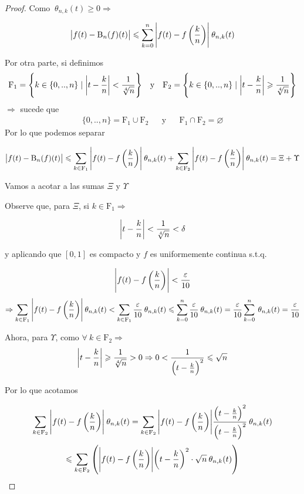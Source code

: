 \begin{proof}
    Como $\: {\theta}_{n,k} (t) \geqslant 0 \Rightarrow$

    $$\abs{f(t)-\mathrm{B}_n(f)(t)} \leqslant \sum\limits_{k=0}^{n} \abs{f(t)-f \left( \frac{k}{n} \right) } \: {\theta}_{n,k} (t)$$

    Por otra parte, si definimos 
    \begin{align*}
        \mathrm{F}_1= \left\{ k \in \{0, .., n \} \mid \abs{t-\frac{k}{n}} < \frac{1}{\sqrt[4]{n}} \right\} && \text{y} && \mathrm{F}_2= \left\{ k \in \{0, .., n \} \mid \abs{t-\frac{k}{n}} \geqslant \frac{1}{\sqrt[4]{n}} \right\}
    \end{align*}
    $\Rightarrow$ sucede que
    \begin{align*}
       \{0, .., n \} = \mathrm{F}_1 \cup \mathrm{F}_2 && \text{y} && \mathrm{F}_1 \cap \mathrm{F}_2 = \varnothing
    \end{align*}
    Por lo que podemos separar

    $$\abs{f(t)-\mathrm{B}_n(f)(t)} \leqslant \sum\limits_{k\in \mathrm{F}_1} \abs{f(t)-f \left( \frac{k}{n} \right) } \: {\theta}_{n,k} (t)  + \sum\limits_{k\in \mathrm{F}_2} \abs{f(t)-f \left( \frac{k}{n} \right) } \: {\theta}_{n,k} (t) = \Xi + \Upsilon$$

    Vamos a acotar a las sumas $\Xi$ y $\Upsilon$

    Observe que, para $\Xi$, si $k \in \mathrm{F}_1 \Rightarrow $ 
    
    $$\abs{t-\frac{k}{n}} < \frac{1}{\sqrt[4]{n}} < \delta$$ 
    
    y aplicando que $[0,1]$ es compacto y $f$ es uniformemente continua s.t.q. 
    
    $$\abs{f(t)-f\left( \frac{k}{n} \right)} < \frac{\varepsilon}{10}$$
    $$\Rightarrow \sum\limits_{k\in \mathrm{F}_1} \abs{f(t)-f \left( \frac{k}{n} \right) } \: {\theta}_{n,k} (t)  < \sum\limits_{k\in \mathrm{F}_1} \frac{\varepsilon}{10} \: {\theta}_{n,k} (t) \leqslant \sum\limits_{k=0}^{n} \frac{\varepsilon}{10} \: {\theta}_{n,k} (t) =  \frac{\varepsilon}{10} \sum\limits_{k=0}^{n} \: {\theta}_{n,k} (t) =  \frac{\varepsilon}{10}$$

    Ahora, para $\Upsilon$, como $\forall \: k \in \mathrm{F}_2 \Rightarrow$
    $$\abs{t-\frac{k}{n}} \geqslant \frac{1}{\sqrt[4]{n}} > 0 \Rightarrow 0 < \frac{1}{{\left( t- \frac{k}{n} \right)}^{2}} \leqslant \sqrt{n}$$

    Por lo que acotamos

    $$\sum\limits_{k\in \mathrm{F}_2} \abs{f(t)-f \left( \frac{k}{n} \right) } \: {\theta}_{n,k} (t) = \sum\limits_{k\in \mathrm{F}_2} \abs{f(t)-f \left( \frac{k}{n} \right) } \frac{{\left( t- \frac{k}{n} \right)}^{2}}{{\left( t- \frac{k}{n} \right)}^{2}}  \: {\theta}_{n,k} (t) $$
    $$\leqslant \sum\limits_{k\in \mathrm{F}_2} \left( \abs{f(t)-f \left( \frac{k}{n} \right) } {\left( t- \frac{k}{n} \right)}^{2} \cdot \sqrt{n}  \: {\theta}_{n,k} (t) \right) $$


\end{proof}
